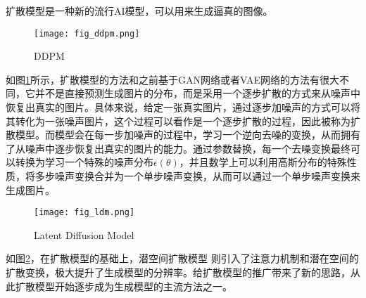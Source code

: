 扩散模型是一种新的流行AI模型，可以用来生成逼真的图像。

\begin{figure}[H]
    \texttt{[image: fig\_ddpm.png]}
    \caption{DDPM \cite{hoDenoisingDiffusionProbabilistic2020}}
    \label{fig:ddpm}
\end{figure}

如图\ref{fig:ddpm}所示，扩散模型的方法和之前基于GAN网络或者VAE网络的方法有很大不同，它并不是直接预测生成图片的分布，而是采用一个逐步扩散的方式来从噪声中恢复出真实的图片。具体来说，给定一张真实图片，通过逐步加噪声的方式可以将其转化为一张噪声图片，这个过程可以看作是一个逐步扩散的过程，因此被称为扩散模型。而模型会在每一步加噪声的过程中，学习一个逆向去噪的变换，从而拥有了从噪声中逐步恢复出真实的图片的能力。通过参数替换，每一个去噪变换最终可以转换为学习一个特殊的噪声分布$\epsilon(\theta)$，并且数学上可以利用高斯分布的特殊性质，将多步噪声变换合并为一个单步噪声变换，从而可以通过一个单步噪声变换来生成图片。

\begin{figure}[H]
    \texttt{[image: fig\_ldm.png]}
    \caption{Latent Diffusion Model}
    \label{fig:ldm}
\end{figure}

如图\ref{fig:ldm}，在扩散模型的基础上，潜空间扩散模型\cite{rombachHighResolutionImageSynthesis2022} 则引入了注意力机制和潜在空间的扩散变换，极大提升了生成模型的分辨率。给扩散模型的推广带来了新的思路，从此扩散模型开始逐步成为生成模型的主流方法之一。